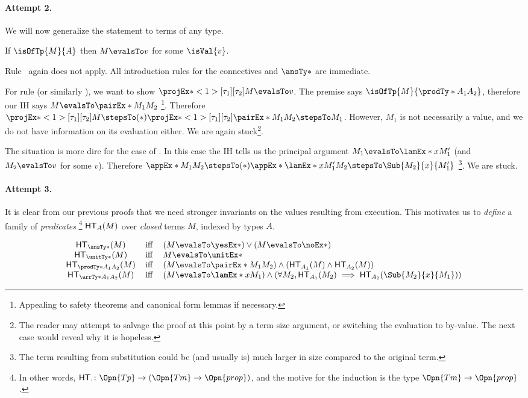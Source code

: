\documentclass[letterpaper]{article}
\begin{document}
\paragraph{Attempt 2.} We will now generalize the statement to terms of any type.

\begin{conjecture}
If $\isOfTp{M}{A}$ then $M \evalsTo v$ for some $\isVal{v}$.
\end{conjecture}

Rule~ again does not apply.
All introduction rules for the connectives and $\ansTy*$ are immediate.

For rule  (or similarly ), we want to show $\fstEx*{M} \evalsTo v$. The premise
says $\isOfTp{M}{\prodTy*{A_1}{A_2}}$, therefore our IH says $M \evalsTo \pairEx*{M_1}{M_2}$
\footnote{Appealing to safety theorems and canonical form lemmas if necessary.}.
Therefore $\fstEx*{M} \stepsTo(*) \fstEx*{\pairEx*{M_1}{M_2}} \stepsTo M_1$. However, $M_1$ is
not necessarily a value, and we do not have information on its evaluation either.
We are again stuck\footnote{The reader may attempt to salvage the proof at this point by a term size argument,
or switching the evaluation to by-value. The next case would reveal why it is hopeless.}.

The situation is more dire for the case of . In this case the IH tells us
the principal argument $M_1 \evalsTo \lamEx*{x}{M_1'}$ (and $M_2 \evalsTo v$ for some $v$).
Therefore $\appEx*{M_1}{M_2} \stepsTo(*) \appEx*{\lamEx*{x}{M_1'}}{M_2} \stepsTo \Sub{M_2}{x}{M_1'}$
\footnote{The term resulting from substitution could be (and usually is) much larger in size compared to the original term.}.
We are stuck.

\paragraph{Attempt 3.} It is clear from our previous proofs that we need stronger invariants on the
values resulting from execution. This motivates us to \emph{define} a family of \emph{predicates}
\footnote{In other words, $\HT[\cdot] \colon \Opn{Tp} \to (\Opn{Tm} \to \Opn{prop})$, and
the motive for the induction is the type $\Opn{Tm} \to \Opn{prop}$.} $\HT[A](M)$ over
\emph{closed} terms $M$, indexed by types $A$.

\begin{definition}
  $$
\begin{array}{cll}
	\HT[\ansTy*](M) & \Iff &
     (M \evalsTo \yesEx*) \lor (M \evalsTo \noEx*) \\
	\HT[\unitTy*](M) & \Iff &
     M \evalsTo \unitEx* \\
	\HT[\prodTy*{A_1}{A_2}](M) & \Iff &
	   (M \evalsTo \pairEx*{M_1}{M_2}) \land (\HT[A_1](M) \land \HT[A_2](M)) \\
	\HT[\arrTy*{A_1}{A_2}](M) & \Iff &
	   (M \evalsTo \lamEx*{x}{M_1}) \land (\forall M_2, \HT[A_1](M_2) \implies \HT[A_2](\Sub{M_2}{x}{M_1})) \\
\end{array}
$$
\end{definition}
\end{document}
